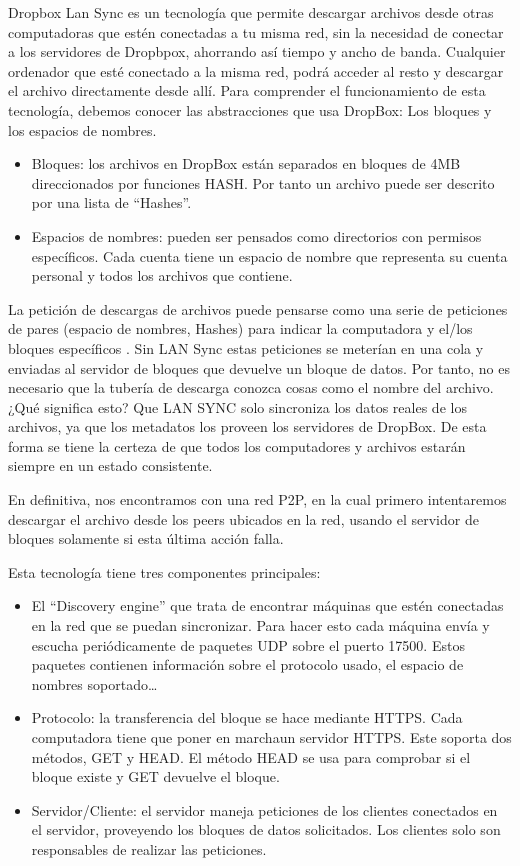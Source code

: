 \begin{enumerate}
Dropbox Lan Sync es un tecnología que permite descargar archivos desde otras computadoras que estén conectadas a tu misma red, sin la necesidad de conectar a los servidores de Dropbpox, ahorrando así tiempo y ancho de banda. Cualquier ordenador que esté conectado a la misma red, podrá acceder al resto y descargar el archivo directamente desde allí.
Para comprender el funcionamiento de esta tecnología, debemos conocer las abstracciones que usa DropBox: Los bloques y los espacios de nombres. 
\begin{itemize}
	\item Bloques: los archivos en DropBox están separados en bloques de 4MB direccionados por funciones HASH. Por tanto un archivo puede ser descrito por una lista de “Hashes”.
	\item Espacios de nombres:   pueden ser pensados como directorios con permisos específicos. Cada cuenta tiene un espacio de nombre que representa su cuenta personal  y todos los archivos que contiene. 
\end{itemize}



La petición de descargas de archivos puede pensarse como una serie de peticiones de pares (espacio de nombres, Hashes) para indicar  la computadora y el/los bloques específicos . Sin LAN Sync estas peticiones se meterían en una cola  y enviadas al servidor de bloques que devuelve un bloque de datos. Por tanto, no es necesario que la tubería de descarga conozca cosas como el nombre del archivo. ¿Qué significa esto? Que  LAN SYNC solo sincroniza los datos reales de los archivos, ya que los metadatos los proveen los servidores de DropBox. De esta forma se tiene la certeza de que todos los computadores y archivos estarán siempre en un estado consistente.


En definitiva, nos encontramos con una red P2P, en la cual primero intentaremos descargar el archivo desde los peers ubicados en la red, usando el servidor de bloques solamente si esta última acción falla.

Esta tecnología tiene tres componentes principales:
\begin{itemize}
\item El “Discovery engine” que trata de encontrar máquinas que estén conectadas en la red que se puedan sincronizar. Para hacer esto cada máquina envía y escucha periódicamente de paquetes UDP sobre el puerto 17500. Estos paquetes contienen información sobre el protocolo usado, el espacio de nombres soportado…
\item Protocolo:  la transferencia del bloque se hace mediante HTTPS. Cada computadora tiene que poner en marchaun servidor HTTPS. Este soporta dos métodos, GET y HEAD. El método HEAD se usa para comprobar si el bloque existe y GET devuelve el bloque.
\item Servidor/Cliente: el servidor maneja peticiones de los clientes conectados en el servidor, proveyendo los bloques de datos solicitados. Los clientes solo son responsables de realizar las peticiones.  
\end{itemize}
\end{enumerate}
